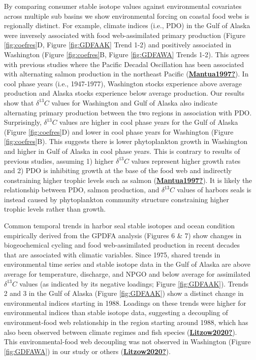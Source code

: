 \documentclass [11pt, proquest] {uwthesis}[2015/03/03]
\begin{document}
By comparing consumer stable isotope values against environmental covariates across multiple sub basins we show environmental forcing on coastal food webs is regionally distinct. For example, climate indices (i.e., PDO) in the Gulf of Alaska were inversely associated with food web-assimilated primary production (Figure \ref{fig:coefres}D, Figure \ref{fig:GDFAAK} Trend 1-2) and positively associated in Washington (Figure \ref{fig:coefres}B, Figure \ref{fig:GDFAWA} Trends 1-2). This agrees with previous studies where the Pacific Decadal Oscillation has been associated with alternating salmon production in the northeast Pacific (\protect\hyperlink{ref-Mantua1997}{\textbf{Mantua1997?}}). In cool phase years (i.e., 1947-1977), Washington stocks experience above average production and Alaska stocks experience below average production. Our results show that \(\delta^{13}C\) values for Washington and Gulf of Alaska also indicate alternating primary production between the two regions in association with PDO. Surprisingly, \(\delta^{13}C\) values are higher in cool phase years for the Gulf of Alaska (Figure \ref{fig:coefres}D) and lower in cool phase years for Washington (Figure \ref{fig:coefres}B). This suggests there is lower phytoplankton growth in Washington and higher in Gulf of Alaska in cool phase years. This is contrary to results of previous studies, assuming 1) higher \(\delta^{13}C\) values represent higher growth rates and 2) PDO is inhibiting growth at the base of the food web and indirectly constraining higher trophic levels such as salmon (\protect\hyperlink{ref-Mantua1997}{\textbf{Mantua1997?}}). It is likely the relationship between PDO, salmon production, and \(\delta^{13}C\) values of harbors seals is instead caused by phytoplankton community structure constraining higher trophic levels rather than growth.

Common temporal trends in harbor seal stable isotopes and ocean condition empirically derived from the GPDFA analysis (Figures 6 \& 7) show changes in biogeochemical cycling and food web-assimilated production in recent decades that are associated with climatic variables. Since 1975, shared trends in environmental time series and stable isotope data in the Gulf of Alaska are above average for temperature, discharge, and NPGO and below average for assimilated \(\delta^{13}C\) values (as indicated by its negative loadings; Figure \ref{fig:GDFAAK}). Trends 2 and 3 in the Gulf of Alaska (Figure \ref{fig:GDFAAK}) show a distinct change in environmental indices starting in 1988. Loadings on these trends were higher for environmental indices than stable isotope data, suggesting a decoupling of environment-food web relationship in the region starting around 1988, which has also been observed between climate regimes and fish species (\protect\hyperlink{ref-Litzow2020}{\textbf{Litzow2020?}}). This environmental-food web decoupling was not observed in Washington (Figure \ref{fig:GDFAWA}) in our study or others (\protect\hyperlink{ref-Litzow2020}{\textbf{Litzow2020?}}).
\end{document}
